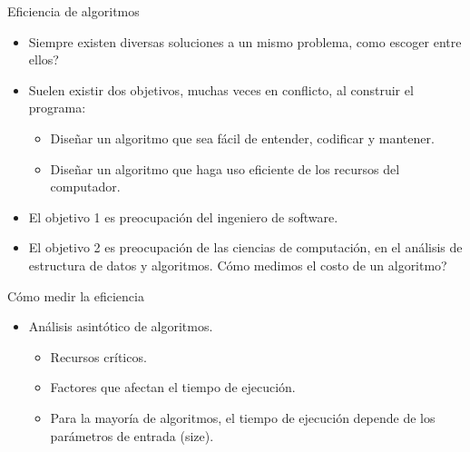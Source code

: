 \documentclass[aspectratio=169]{beamer}
\begin{document}
\begin{frame}{Eficiencia de algoritmos}
  \begin{itemize}
    \item Siempre existen diversas soluciones a un mismo problema, como escoger entre ellos?
    \item Suelen existir dos objetivos, muchas veces en conflicto, al construir el programa:
    \begin{itemize}
      \item Diseñar un algoritmo que sea fácil de entender, codificar y mantener.
      \item Diseñar un algoritmo que haga uso eficiente de los recursos del computador.
    \end{itemize}
    \item El objetivo 1 es preocupación del ingeniero de software.
    \item El objetivo 2 es preocupación de las ciencias de computación, en el análisis de estructura de datos y algoritmos. Cómo medimos el costo de un algoritmo?
  \end{itemize}
\end{frame}

\begin{frame}{Cómo medir la eficiencia}
  \begin{itemize}
    \item Análisis asintótico de algoritmos.
    \begin{itemize}
      \item Recursos críticos.
      \item Factores que afectan el tiempo de ejecución.
      \item Para la mayoría de algoritmos, el tiempo de ejecución depende de los parámetros de entrada (size).
    \end{itemize}
  \end{itemize}
\end{frame}
\end{document}
